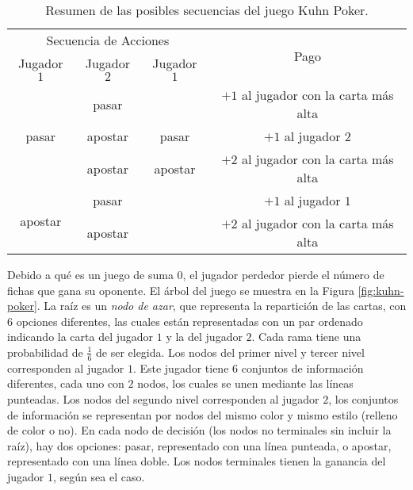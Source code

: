 \begin{table}[h]
\begin{center}
\caption[Resumen de las posibles secuencias del juego Kuhn Poker]{Resumen de las posibles secuencias del juego Kuhn Poker.}
\label{table:kuhn-poker}
\begin{tabular}{ c c c c }
\hline
\multicolumn{3}{c}{Secuencia de Acciones} & \multirow{2}{*}{Pago} \\ \cmidrule{1-3}
Jugador $1$ & Jugador $2$ & Jugador $1$ &  \\ \midrule
\multirow{3}{*}{pasar} & pasar & & $+1$ al jugador con la carta más alta\\
& apostar & pasar & $+1$ al jugador $2$\\
& apostar & apostar & $+2$ al jugador con la carta más alta \\ \hline
\multirow{2}{*}{apostar} & pasar & & $+1$ al jugador $1$ \\
& apostar & &  $+2$ al jugador con la carta más alta \\ \hline
\end{tabular}
\end{center}
\end{table}

Debido a qué es un juego de suma $0$, el jugador perdedor pierde el número de fichas que gana su oponente. El árbol del juego se muestra en la Figura \ref{fig:kuhn-poker}. La raíz es un \textit{nodo de azar}, que representa la repartición de las cartas, con $6$ opciones diferentes, las cuales están representadas con un par ordenado indicando la carta del jugador $1$ y la del jugador $2$. Cada rama tiene una probabilidad de $\frac{1}{6}$ de ser elegida. Los nodos del primer nivel y tercer nivel corresponden al jugador $1$. Este jugador tiene $6$ conjuntos de información diferentes, cada uno con $2$ nodos, los cuales se unen mediante las líneas punteadas. Los nodos del segundo nivel corresponden al jugador $2$, los conjuntos de información se representan por nodos del mismo color y mismo estilo (relleno de color o no). En cada nodo de decisión (los nodos no terminales sin incluir la raíz), hay dos opciones: pasar, representado con una línea punteada, o apostar, representado con una línea doble. Los nodos terminales tienen la ganancia del jugador $1$, según sea el caso.

